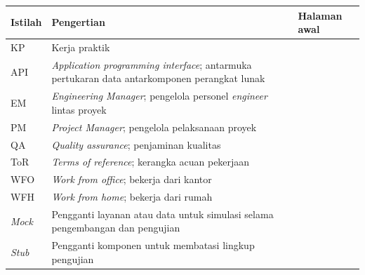 \begin{tabularx}{\textwidth}{@{}P{2cm}YP{2cm}@{}}
\toprule
\textbf{Istilah} & \textbf{Pengertian} & \textbf{Halaman awal}\\\midrule
KP & Kerja praktik & \pageref{sec:latar}\\
API & \textit{Application programming interface}; antarmuka pertukaran data antarkomponen perangkat lunak & \pageref{istilah:api}\\
EM & \textit{Engineering Manager}; pengelola personel \textit{engineer} lintas proyek & \pageref{istilah:em}\\
PM & \textit{Project Manager}; pengelola pelaksanaan proyek & \pageref{istilah:pm}\\
QA & \textit{Quality assurance}; penjaminan kualitas & \pageref{istilah:qa}\\
ToR & \textit{Terms of reference}; kerangka acuan pekerjaan & \pageref{sec:sistematika}\\
WFO & \textit{Work from office}; bekerja dari kantor & \pageref{sec:jadwal}\\
WFH & \textit{Work from home}; bekerja dari rumah & \pageref{sec:jadwal}\\
\textit{Mock} & Pengganti layanan atau data untuk simulasi selama pengembangan dan pengujian & \pageref{sec:dasbor}\\
\textit{Stub} & Pengganti komponen untuk membatasi lingkup pengujian & \pageref{sec:pengujian}\\
\bottomrule
\end{tabularx}
